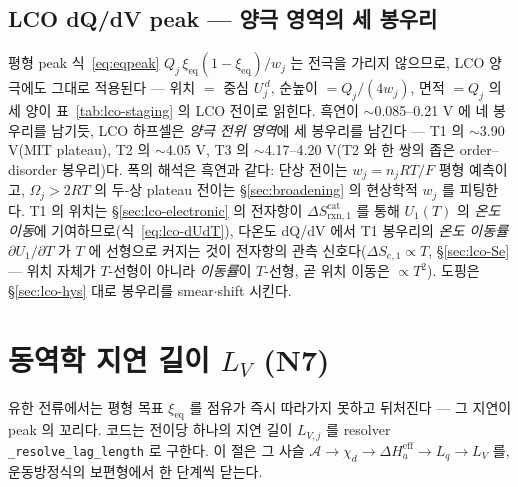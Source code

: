 \documentclass[11pt,a4paper]{article}
\newcommand{\eff}{\mathrm{eff}}
\newcommand{\eq}{\mathrm{eq}}
\newcommand{\rxn}{\mathrm{rxn}}
\newcommand{\code}[1]{\texttt{#1}}
\begin{document}
\subsection{LCO dQ/dV peak — 양극 영역의 세 봉우리}\label{sec:lco-peak}
평형 peak 식~\eqref{eq:eqpeak} $Q_j\,\xi_\eq(1-\xi_\eq)/w_j$ 는 전극을 가리지 않으므로, LCO 양극에도 그대로 적용된다 —
위치 $=$ 중심 $U_j^{\,d}$, 순높이 $=Q_j/(4w_j)$, 면적 $=Q_j$ 의 세 양이 표~\ref{tab:lco-staging} 의 LCO 전이로 읽힌다.
흑연이 $\sim$0.085--0.21 V 에 네 봉우리를 남기듯, LCO 하프셀은 \emph{양극 전위 영역}에 세 봉우리를 남긴다 — T1 의
$\sim$3.90 V(MIT plateau), T2 의 $\sim$4.05 V, T3 의 $\sim$4.17--4.20 V(T2 와 한 쌍의 좁은 order--disorder 봉우리)다.
폭의 해석은 흑연과 같다: 단상 전이는 $w_j=n_jRT/F$ 평형 예측이고, $\Omega_j>2RT$ 의 두-상 plateau 전이는
\S\ref{sec:broadening} 의 현상학적 $w_j$ 를 피팅한다. T1 의 위치는 \S\ref{sec:lco-electronic} 의 전자항이
$\Delta S_{\rxn,1}^\mathrm{cat}$ 를 통해 $U_1(T)$ 의 \emph{온도 이동}에 기여하므로(식~\eqref{eq:lco-dUdT}), 다온도
dQ/dV 에서 T1 봉우리의 \emph{온도 이동률} $\partial U_1/\partial T$ 가 $T$ 에 선형으로 커지는 것이 전자항의 관측
신호다($\Delta S_{e,1}\propto T$, \S\ref{sec:lco-Se} — 위치 자체가 $T$-선형이 아니라 \emph{이동률}이 $T$-선형, 곧 위치
이동은 $\propto T^2$). 도핑은 \S\ref{sec:lco-hys} 대로 봉우리를 smear$\cdot$shift 시킨다.

\section{동역학 지연 길이 $L_V$ (N7)}\label{sec:lag}
유한 전류에서는 평형 목표 $\xi_\eq$ 를 점유가 즉시 따라가지 못하고 뒤처진다 — 그 지연이 peak 의 꼬리다. 코드는 전이당
하나의 지연 길이 $L_{V,j}$ 를 resolver \code{\_resolve\_lag\_length} 로 구한다. 이 절은 그 사슬
$\mathcal A\to\chi_d\to\Delta H_a^\eff\to L_q\to L_V$ 를, 운동방정식의 보편형에서 한 단계씩 닫는다.
\end{document}
